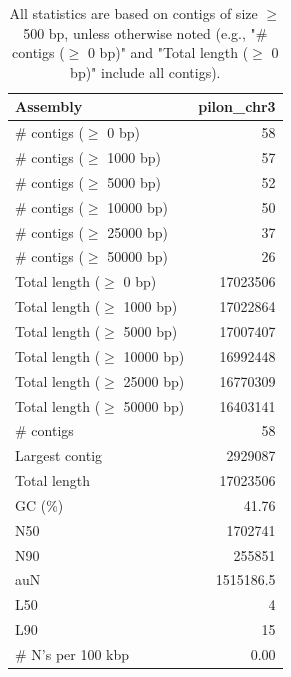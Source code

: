 \documentclass[12pt,a4paper]{article}
\begin{document}
\begin{table}[ht]
\begin{center}
\caption{All statistics are based on contigs of size $\geq$ 500 bp, unless otherwise noted (e.g., "\# contigs ($\geq$ 0 bp)" and "Total length ($\geq$ 0 bp)" include all contigs).}
\begin{tabular}{|l*{1}{|r}|}
\hline
Assembly & pilon\_chr3 \\ \hline
\# contigs ($\geq$ 0 bp) & 58 \\ \hline
\# contigs ($\geq$ 1000 bp) & 57 \\ \hline
\# contigs ($\geq$ 5000 bp) & 52 \\ \hline
\# contigs ($\geq$ 10000 bp) & 50 \\ \hline
\# contigs ($\geq$ 25000 bp) & 37 \\ \hline
\# contigs ($\geq$ 50000 bp) & 26 \\ \hline
Total length ($\geq$ 0 bp) & 17023506 \\ \hline
Total length ($\geq$ 1000 bp) & 17022864 \\ \hline
Total length ($\geq$ 5000 bp) & 17007407 \\ \hline
Total length ($\geq$ 10000 bp) & 16992448 \\ \hline
Total length ($\geq$ 25000 bp) & 16770309 \\ \hline
Total length ($\geq$ 50000 bp) & 16403141 \\ \hline
\# contigs & 58 \\ \hline
Largest contig & 2929087 \\ \hline
Total length & 17023506 \\ \hline
GC (\%) & 41.76 \\ \hline
N50 & 1702741 \\ \hline
N90 & 255851 \\ \hline
auN & 1515186.5 \\ \hline
L50 & 4 \\ \hline
L90 & 15 \\ \hline
\# N's per 100 kbp & 0.00 \\ \hline
\end{tabular}
\end{center}
\end{table}
\end{document}

